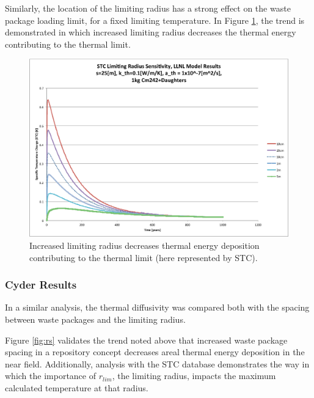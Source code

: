 Similarly, the location of the limiting radius has a strong effect on the 
waste package loading limit, for a fixed limiting temperature. In Figure 
\ref{fig:Cm242r_lim_sens}, the trend is demonstrated in which increased limiting 
radius decreases the thermal energy contributing to the thermal limit. 


\begin{figure}[htbp!]
\begin{center}
\includegraphics[width=\columnwidth]{./thermal_demonstration/spacing/Cm242r_lim_sens.eps}
\end{center}
\caption[$K_{th}$ Sensitivity to $r_{lim}$]{Increased limiting radius 
decreases thermal energy deposition contributing to the thermal limit
(here represented by \gls{STC}).}
\label{fig:Cm242r_lim_sens}
\end{figure}


\subsubsection{Cyder Results}

In a similar analysis, the thermal diffusivity was compared both with the 
spacing between waste packages and the limiting radius. 

Figure \ref{fig:rs} validates the trend noted above that 
increased waste package spacing in a repository concept decreases areal thermal energy deposition 
in the near field.  Additionally, analysis with the \Cyder STC database 
demonstrates the way in which the importance of $r_{lim}$, the limiting radius, 
impacts the maximum calculated temperature at that radius. 


